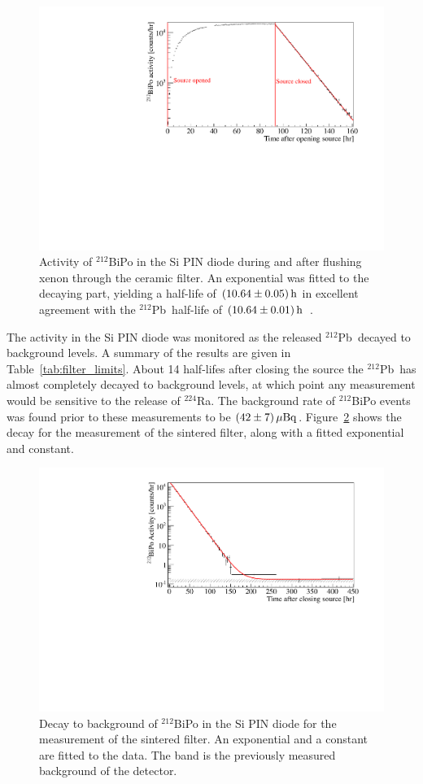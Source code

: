 \begin{figure}[htb]
\centering
    \includegraphics[trim = 5 5 40 15, clip = true,width = 0.8\columnwidth]{figures/rnsource/bipo_activity}
    \caption{Activity of $^{212}$BiPo in the Si PIN diode during and after flushing xenon through the ceramic filter. An exponential was fitted to the decaying part, yielding a half-life of $(10.64\pm0.05)\,\mathrm{h}$ in excellent agreement with the $^{212}$Pb~half-life of $(10.64\pm0.01)\,\mathrm{h}$~\cite{Firestone}.}\label{fig:bipo}
\end{figure}

The activity in the Si PIN diode was monitored as the released $^{212}$Pb~decayed to background levels. A summary of the results are given in Table~\ref{tab:filter_limits}. About 14 half-lifes after closing the source the $^{212}$Pb~has almost completely decayed to background levels, at which point any measurement would be sensitive to the release of $^{224}$Ra. The background rate of $^{212}$BiPo events was found prior to these measurements to be $(42\pm7)\,\mathrm{\mu Bq}$. Figure~\ref{fig:bipo_background} shows the decay for the measurement of the sintered filter, along with a fitted exponential and constant.

\begin{figure}[htb]
\centering
    \includegraphics[trim = 10 5 40 15, clip = true,width = 0.8\columnwidth]{figures/rnsource/bipo_background_sintered}
    \caption{Decay to background of $^{212}$BiPo in the Si PIN diode for the measurement of the sintered filter. An exponential and a constant are fitted to the data. The band is the previously measured background of the detector.}\label{fig:bipo_background}
\end{figure}

